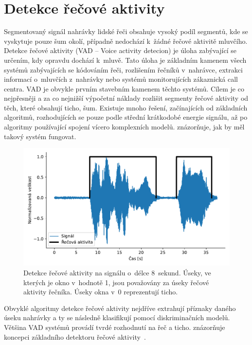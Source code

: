 
\section{Detekce řečové aktivity}
\label{section:VAD}
Segmentovaný signál nahrávky lidské řeči obsahuje vysoký podíl segmentů, kde se vyskytuje pouze šum okolí, případně nedochází k~žádné řečové aktivitě mluvčího. Detekce řečové aktivity (VAD -- Voice activity detecion) je úloha zabývající se určením, kdy opravdu dochází k~mluvě. Tato úloha je základním kamenem všech systémů zabývajících se kódováním řeči, rozlišením řečníků v~nahrávce, extrakci informací o~mluvčích z~nahrávky nebo systémů monitorujících zákaznická call centra. VAD je obvykle prvním stavebním kamenem těchto systémů. Cílem je co nejpřesněji a za co nejnižší výpočetní náklady rozlišit segmenty řečové aktivity od těch, které obsahují ticho, šum. Existuje mnoho řešení, začínajících od základních algoritmů, rozhodujících se pouze podle střední krátkodobé energie signálu, až po algoritmy používající spojení vícero komplexních modelů.  znázorňuje, jak by měl takový systém fungovat.   


\begin{figure}[ht]
  \centering
  \includegraphics[width=\linewidth]{obrazky-figures/signal_vad.pdf}
  \caption{Detekce řečové aktivity na signálu o~délce 8~sekund. Úseky, ve kterých je okno v~hodnotě 1, jsou považovány za úseky řečové aktivity řečníka. Úseky okna v~0 reprezentují ticho.}
  \label{fig:VAD}
\end{figure}

Obvyklé algoritmy detekce řečové aktivity nejdříve extrahují příznaky daného úseku nahrávky a ty se následně klasifikují pomocí diskriminačních modelů. Většina VAD systémů provádí tvrdé rozhodnutí na řeč a ticho.  znázorňuje koncepci základního detektoru řečové aktivity~\cite{VAD_overview}. 

